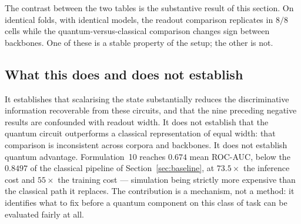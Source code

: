 \documentclass[preprint,12pt]{elsarticle}
\begin{document}
\begin{table}[t]
\centering
\caption{Multiplicity correction over the sixteen paired comparisons in this section (two comparison families $\times$ two backbones $\times$ four corpora). Per-corpus tests use five folds each and are correspondingly underpowered; the pooled tests survive any correction by several orders of magnitude.}
\label{tab:multiplicity}
\end{table}

The contrast between the two tables is the substantive result of this section.
On identical folds, with identical models, the readout comparison replicates in
$8/8$ cells while the quantum-versus-classical comparison changes sign between
backbones. One of these is a stable property of the setup; the other is not.

\subsection{What this does and does not establish}

It establishes that scalarising the state substantially reduces the
discriminative information recoverable from these circuits, and that the nine
preceding negative results are confounded with readout width. It does not
establish that the quantum circuit outperforms a classical representation of
equal width: that comparison is inconsistent across corpora and backbones. It does not establish quantum advantage.
Formulation~10 reaches $0.674$ mean ROC-AUC, below the $0.8497$ of the
classical pipeline of Section~\ref{sec:baseline}, at $73.5\times$ the
inference cost and $55\times$ the training cost --- simulation being strictly
more expensive than the classical path it replaces. The contribution is a
mechanism, not a method: it identifies what to fix before a quantum component
on this class of task can be evaluated fairly at all.
\end{document}
